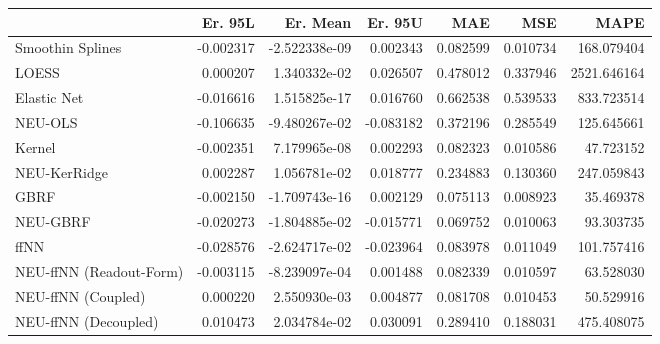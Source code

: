 \begin{tabular}{lrrrrrr}
\toprule
{} &   Er. 95L &      Er. Mean &   Er. 95U &       MAE &       MSE &         MAPE \\
\midrule
Smoothin Splines        & -0.002317 & -2.522338e-09 &  0.002343 &  0.082599 &  0.010734 &   168.079404 \\
LOESS                   &  0.000207 &  1.340332e-02 &  0.026507 &  0.478012 &  0.337946 &  2521.646164 \\
Elastic Net             & -0.016616 &  1.515825e-17 &  0.016760 &  0.662538 &  0.539533 &   833.723514 \\
NEU-OLS                 & -0.106635 & -9.480267e-02 & -0.083182 &  0.372196 &  0.285549 &   125.645661 \\
Kernel                  & -0.002351 &  7.179965e-08 &  0.002293 &  0.082323 &  0.010586 &    47.723152 \\
NEU-KerRidge            &  0.002287 &  1.056781e-02 &  0.018777 &  0.234883 &  0.130360 &   247.059843 \\
GBRF                    & -0.002150 & -1.709743e-16 &  0.002129 &  0.075113 &  0.008923 &    35.469378 \\
NEU-GBRF                & -0.020273 & -1.804885e-02 & -0.015771 &  0.069752 &  0.010063 &    93.303735 \\
ffNN                    & -0.028576 & -2.624717e-02 & -0.023964 &  0.083978 &  0.011049 &   101.757416 \\
NEU-ffNN (Readout-Form) & -0.003115 & -8.239097e-04 &  0.001488 &  0.082339 &  0.010597 &    63.528030 \\
NEU-ffNN (Coupled)      &  0.000220 &  2.550930e-03 &  0.004877 &  0.081708 &  0.010453 &    50.529916 \\
NEU-ffNN (Decoupled)    &  0.010473 &  2.034784e-02 &  0.030091 &  0.289410 &  0.188031 &   475.408075 \\
\bottomrule
\end{tabular}
